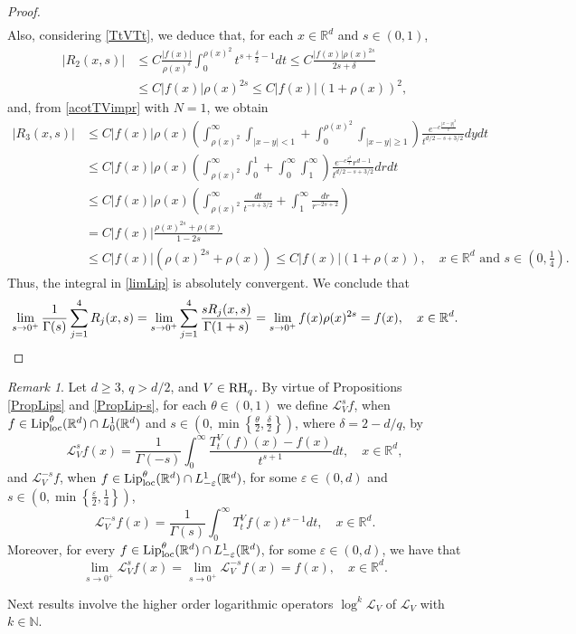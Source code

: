 \documentclass[10pt, a4paper, reqno]{amsart}
\theoremstyle{definition}
\theoremstyle{remark}
\newtheorem{rem}[thm]{Remark}
\numberwithin{equation}{section}
\begin{document}
\begin{proof}
\begin{align*}
\end{align*}
Also, considering \eqref{TtVTt}, we deduce that, for each $x\in \mathbb R^d$ and $s\in (0,1)$,
\begin{align*}
|R_2(x,s)|&\leq C\frac{|f(x)|}{\rho (x)^{\delta}}\int_0^{\rho (x)^2}t^{s+\tfrac{\delta}{2}-1}dt\leq C\frac{|f(x)|\rho (x)^{2s}}{2s+\delta}\\
&\leq C|f(x)|\rho (x)^{2s}\leq C|f(x)|(1+\rho(x))^2,
\end{align*}
and, from \eqref{acotTVimpr} with $N=1$, we obtain
\begin{align*}
|R_3(x,s)|&\leq C|f(x)|\rho (x)\left(\int_{\rho (x)^2}^\infty\int_{|x-y|<1}+\int_0^{\rho (x)^2}\int_{|x-y|\geq 1}\right)\frac{e^{-c\frac{|x-y|^2}{t}}}{t^{d/2-s+3/2}}dydt\\
&\leq  C|f(x)|\rho (x)\left(\int_{\rho (x)^2}^\infty \int_0^1
+\int_0^\infty \int_1^\infty \right)\frac{e^{-c\frac{r^2}{t}}r^{d-1}}{t^{d/2-s+3/2}}drdt\\
&\leq C|f(x)|\rho (x)\left(\int_{\rho (x)^2}^\infty \frac{dt}{t^{-s+3/2}}+\int_1^\infty \frac{dr}{r^{-2s+2}}\right)\\
&=C|f(x)|\frac{\rho (x)^{2s}+\rho (x)}{1-2s}\\\
&\leq C|f(x)|(\rho (x)^{2s}+\rho (x))\leq C|f(x)|(1+\rho(x)),\quad x\in \mathbb R^d\mbox{ and }s\in \left(0,\tfrac{1}{4}\right).
\end{align*}
Thus, the integral in \eqref{limLip} is absolutely convergent. We conclude that
\[
\lim_{s\rightarrow 0^+}\frac{1}{\Gamma (s)}\sum_{j=1}^4R_j(x,s)=\lim_{s\rightarrow 0^+}\sum_{j=1}^4\frac{sR_j(x,s)}{\Gamma (1+s)}=\lim_{s\rightarrow 0^+}f(x)\rho (x)^{2s}=f(x),\quad x\in \mathbb R^d.\qedhere
\]
\end{proof}

\begin{rem}\label{rem} 
Let $d\geq 3$, $q>d/2$, and $V\in {\rm RH}_q$. By virtue of Propositions \ref{PropLips} and \ref{PropLip-s}, for each $\theta \in (0,1)$ we define $\mathcal L_V^sf$, when $f\in {\textup{Lip}}_\textup{loc}^\theta (\mathbb R^d)\cap L^1_0(\mathbb R^d)$ and $s\in (0,\min\left\{\tfrac{\theta}{2},\tfrac{\delta}{2}\right\})$, where $\delta =2-d/q$, by 
\[
\mathcal L_V^sf(x)=\frac{1}{\Gamma (-s)}\int_0^\infty \frac{T_t^V(f)(x)-f(x)}{t^{s+1}}dt,\quad x\in \mathbb R^d, 
\]
and $\mathcal L_V^{-s}f$, when $f\in {\textup{Lip}}_\textup{loc}^\theta (\mathbb R^d)\cap L^1_{-\varepsilon}(\mathbb R^d)$, for some $\varepsilon \in (0,d)$ and $s\in (0,\min\left\{\tfrac{\varepsilon}{2},\tfrac{1}{4}\right\})$,
\[
\mathcal L_V^{-s}f(x)=\frac{1}{\Gamma (s)}\int_0^\infty T_t^Vf(x)t^{s-1}dt,\quad x\in \mathbb R^d.
\]
Moreover, for every $f\in {\textup{Lip}}_\textup{loc}^\theta (\mathbb R^d)\cap L^1_{-\varepsilon}(\mathbb R^d)$, for some $\varepsilon \in (0,d)$, we have that 
\[
\lim_{s\rightarrow 0^+}\mathcal L_V^sf(x)=\lim_{s\rightarrow 0^+}\mathcal L_V^{-s}f(x)=f(x),\quad x\in \mathbb R^d.
\]
\end{rem}
Next results involve the higher order logarithmic operators $\log^k\mathcal{L}_V$ of $\mathcal{L}_V$ with $k\in \mathbb{N}$.
\end{document}
